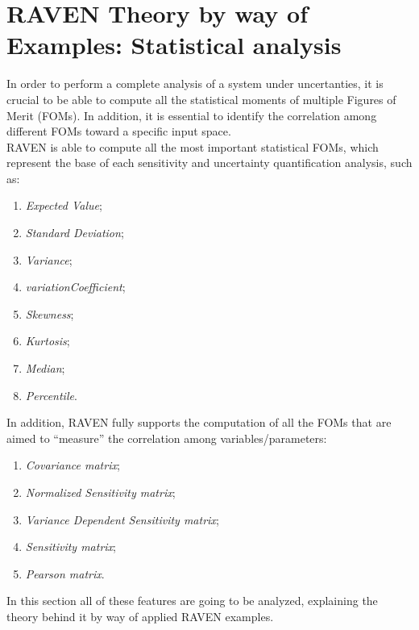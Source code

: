 \section{RAVEN Theory by way of Examples: Statistical analysis}
In order to perform a complete analysis of a system under uncertanties,
it is crucial to be able to compute all the statistical moments of multiple
Figures of Merit (FOMs). In addition, it is essential to identify the correlation
among different FOMs toward a specific input space. 
\\RAVEN is able to compute all the most important statistical FOMs, which
represent the base of each sensitivity and uncertainty quantification analysis,
such as:
\begin{enumerate}
  \item \textit{Expected Value};
  \item \textit{Standard Deviation};
  \item \textit{Variance};
  \item \textit{variationCoefficient}; 
  \item \textit{Skewness};
  \item \textit{Kurtosis};  
  \item \textit{Median}; 
  \item \textit{Percentile}.
\end{enumerate} 
In addition, RAVEN fully supports the computation of all the FOMs that are aimed to
``measure'' the correlation among variables/parameters:
\begin{enumerate}
  \item \textit{Covariance matrix};
  \item \textit{Normalized Sensitivity  matrix};
  \item \textit{Variance Dependent Sensitivity  matrix};
  \item \textit{Sensitivity matrix}; 
  \item \textit{Pearson matrix}.
\end{enumerate} 
In this section all of these features are going to be analyzed, explaining the theory behind it
by way of applied RAVEN examples.
